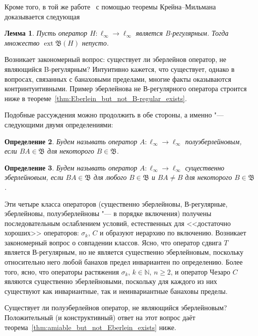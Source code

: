 \documentclass[a4paper,14pt]{article} %
\DeclareMathOperator{\ext}{ext}
\newcommand{\N}{\ensuremath{\mathbb{N}}}
\newcommand{\B}{\ensuremath{\mathfrak{B}}}
\theoremstyle{plain}
\newtheorem{lemma}{Лемма}[section]
\newtheorem{definition}[lemma]{Определение}
\begin{document}
Кроме того, в той же работе~\cite{alekhno2018invariant}
с помощью теоремы Крейна--Мильмана~\cite[Theorem  9.14]{aliprantis2006positive}
доказывается следующая
\begin{lemma}
	Пусть оператор $H:\ell_\infty\to\ell_\infty$ является B-регулярным.
	Тогда множество $\ext\B(H)$ непусто.
\end{lemma}

Возникает закономерный вопрос: существует ли эберлейнов оператор, не являющийся B-регулярным?
Интуитивно кажется, что существует, однако в вопросах, связанных с банаховыми пределами,
многие факты оказываются контринтуитивными.
Пример эберлейнова не В-регулярного оператора строится ниже
в теореме~\ref{thm:Eberlein_but_not_B-regular_exists}.

Подобные рассуждения можно продолжить в обе стороны, а именно "--- следующими двумя определениями:

\begin{definition}
	Будем называть оператор $A:\ell_\infty \to \ell_\infty$ \emph{полуэберлейновым}, если $BA\in\mathfrak B$ для некоторого $B\in\mathfrak B$.
\end{definition}

\begin{definition}
	Будем называть оператор $A:\ell_\infty \to \ell_\infty$ \emph{существенно эберлейновым}, если $BA\in\mathfrak B$ для любого $B\in\mathfrak B$ и $BA\ne B$ для некоторого $B\in\mathfrak B$.
\end{definition}

Эти четыре класса операторов (существенно эберлейновы, В-регулярные, эберлейновы, полуэберлейновы "--- в порядке включения)
получены последовательным ослаблением условий, естественных для <<достаточно хороших>> операторов:
$\sigma_k$, $C$
и образуют иерархию по включению.
Возникает закономерный вопрос о совпадении классов.
Ясно, что оператор сдвига $T$ является В-регулярным, но не является существенно эберлейновым, поскольку относительно него любой банахов предел инвариантен по определению.
Более того, ясно, что операторы растяжения $\sigma_k$, $k\in\N$, $n\geq2$, и оператор Чезаро $C$ являются существенно эберлейновыми,
поскольку для каждого из них существуют как инвариантные, так и неинвариантные банаховы пределы.

Существует ли полуэберлейнов оператор, не являющийся эберлейновым?
Положительный (и конструктивный) ответ на этот вопрос даёт теорема~\ref{thm:amiable_but_not_Eberlein_exists} ниже.
\end{document}
